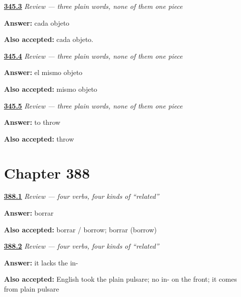 \noindent\begin{minipage}[t]{\linewidth}
\raggedright
\hyperlink{review-ES-C345-repaso-cada-mismo-objeto-cada}{\textbf{345.3}} \emph{Review — three plain words, none of them one piece}\par
\small \textbf{Answer:} cada objeto\par
\footnotesize \textbf{Also accepted:} cada objeto.
\end{minipage}\par\medskip

\noindent\begin{minipage}[t]{\linewidth}
\raggedright
\hyperlink{review-ES-C345-repaso-cada-mismo-objeto-mismo}{\textbf{345.4}} \emph{Review — three plain words, none of them one piece}\par
\small \textbf{Answer:} el mismo objeto\par
\footnotesize \textbf{Also accepted:} mismo objeto
\end{minipage}\par\medskip

\noindent\begin{minipage}[t]{\linewidth}
\raggedright
\hyperlink{review-ES-C345-repaso-cada-mismo-objeto-partes}{\textbf{345.5}} \emph{Review — three plain words, none of them one piece}\par
\small \textbf{Answer:} to throw\par
\footnotesize \textbf{Also accepted:} throw
\end{minipage}\par\medskip

\section*{Chapter 388}

\noindent\begin{minipage}[t]{\linewidth}
\raggedright
\hyperlink{review-ES-C388-repaso-cuatro-hedges-norelation}{\textbf{388.1}} \emph{Review — four verbs, four kinds of \textquotedblleft{}related\textquotedblright{}}\par
\small \textbf{Answer:} borrar\par
\footnotesize \textbf{Also accepted:} borrar / borrow; borrar (borrow)
\end{minipage}\par\medskip

\noindent\begin{minipage}[t]{\linewidth}
\raggedright
\hyperlink{review-ES-C388-repaso-cuatro-hedges-cousin}{\textbf{388.2}} \emph{Review — four verbs, four kinds of \textquotedblleft{}related\textquotedblright{}}\par
\small \textbf{Answer:} it lacks the in-\par
\footnotesize \textbf{Also accepted:} English took the plain pulsare; no in- on the front; it comes from plain pulsare
\end{minipage}\par\medskip

